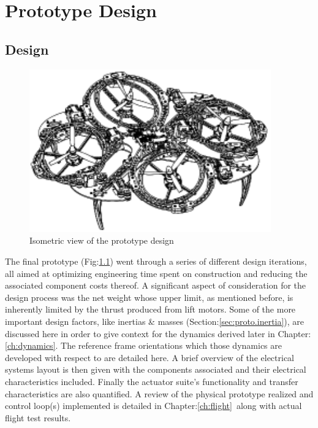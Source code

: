 \chapter{Prototype Design}
\label{ch:proto}
\section{Design}
\label{sec:proto.design}
\begin{figure}[htbp]
\centering
\includegraphics[width=0.93\textwidth]{figs/iso-design}
\caption{Isometric view of the prototype design}
\label{fig:iso-design}
\end{figure}
The final prototype (Fig:\ref{fig:iso-design}) went through a series of different design iterations, all aimed at optimizing engineering time spent on construction and reducing the associated component costs thereof. A significant aspect of consideration for the design process was the net weight whose upper limit, as mentioned before, is inherently limited by the thrust produced from lift motors. Some of the more important design factors, like inertias \& masses (Section:\ref{sec:proto.inertia}), are discussed here in order to give context for the dynamics derived later in Chapter:\ref{ch:dynamics}. The reference frame orientations which those dynamics are developed with respect to are detailed here. A brief overview of the electrical systems layout is then given with the components associated and their electrical characteristics included. Finally the actuator suite's functionality and transfer characteristics are also quantified. A review of the physical prototype realized and control loop(s) implemented is detailed in Chapter:\ref{ch:flight}~along with actual flight test results.
\newpage
